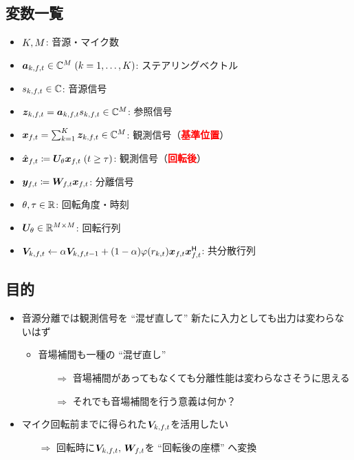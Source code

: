 \documentclass[twocolumn,9pt,dvipdfmx]{article}
\begin{document}
\subsection*{変数一覧}
\begin{itemize}
  \item $K, M$: 音源・マイク数
  \item $\steer _{\src,\ft} \in \C ^{\Mic}\; (\src = 1, \dots, \Src)$: ステアリングベクトル
  \item $\sig _{\src,\ft} \in \C$: 音源信号
  \item $\Img _{\src,\ft} = \steer _{\src,\ft} \sig _{\src,\ft} \in \C^{\Mic}$: 参照信号%
  \item $\Obs _{\ft} = \sum _{\src=1} ^{\Src} \Img _{\src,\ft} \in \C^{\Mic}$: 観測信号（\textcolor{red}{\textbf{基準位置}}）
  \item $\rotObs _{\ft} \coloneqq \rotMat _{\rotDeg} \Obs _{\ft} \; (\tframe \geq \rotFra)$: 観測信号（\textcolor{red}{\textbf{回転後}}）
  \item $\Est _{\ft} \coloneqq \Demix _{\ft} \Obs _{\ft}$: 分離信号
  \item $\theta, \tau \in \mathbb{R}$: 回転角度・時刻
  \item $\bm{U} _{\theta} \in \mathbb{R} ^{M \times M}$: 回転行列
  \item $\cov _{\src,\ft} \gets \forget \cov _{\src,\ft[-1]} + (1 - \forget) \weight (\var _{\src,\tframe}) \Obs _{\ft} \Obs _{\ft} ^{\hermite}$: 共分散行列
\end{itemize}

\subsection*{目的}
\begin{itemize}
  \item 音源分離では観測信号を ``混ぜ直して'' 新たに入力としても出力は変わらないはず
    \begin{itemize}
      \item 音場補間も一種の ``混ぜ直し''
        \begin{itemize}
          \item[$\Rightarrow$] 音場補間があってもなくても分離性能は変わらなさそうに思える
          \item[$\Rightarrow$] それでも音場補間を行う意義は何か？
        \end{itemize}
    \end{itemize}
  \item マイク回転前までに得られた$\cov _{\src,\ft}$を活用したい
    \begin{itemize}
      \item[$\Rightarrow$] 回転時に$\cov _{\src,\ft},\, \Demix _{\ft}$を ``回転後の座標'' へ変換
    \end{itemize}
\end{itemize}
\end{document}
